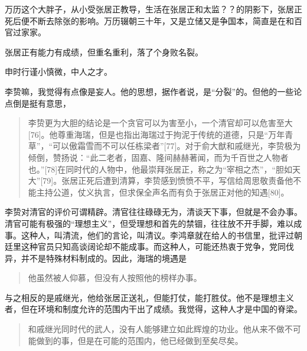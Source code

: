 万历这个大胖子，从小受张居正教导，生活在张居正和太监？？的阴影下，张居正死后便不断去除张的影响。万历辍朝三十年，又是立储又是争国本，简直是在和百官过家家。

张居正有能力有成绩，但重名重利，落了个身败名裂。

申时行谨小慎微，中人之才。

李贽嘛，我觉得有点像是妄人。他的思想，据作者说，是“分裂”的。但他的一些论点倒是挺有意思，
\begin{quotation}
李贽更为大胆的结论是一个贪官可以为害至小，一个清官却可以危害至大[76]。他尊重海瑞，但是也指出海瑞过于拘泥于传统的道德，只是“万年青草”，“可以傲霜雪而不可以任栋梁者”[77]。对于俞大猷和戚继光，李贽极为倾倒，赞扬说：“此二老者，固嘉、隆间赫赫著闻，而为千百世之人物者也。”[78]在同时代的人物中，他最崇拜张居正，称之为“宰相之杰”，“胆如天大”[79]。张居正死后遭到清算，李贽感到愤愤不平，写信给周思敬责备他不能主持公道，仗义执言，但求保全声名而有负于张居正对他的知遇[80]。
\end{quotation}
李贽对清官的评价可谓精辟。清官往往碌碌无为，清谈天下事，但就是不会办事。清官可能有极强的“理想主义”，但受理想和首先的禁锢，往往放不开手脚，难以成事。这种人，叫清流，他们的言论，叫清议。李鸿章就在给人的书信里，批评过朝廷里这种官员只知高谈阔论却不能成事。而这种人，可能还热衷于党争，党同伐异，并不是特殊材料制成的。因此，海瑞的境遇是
\begin{quotation}
他虽然被人仰慕，但没有人按照他的榜样办事。
\end{quotation}
与之相反的是戚继光，他给张居正送礼，但能打仗，能打胜仗。他不是理想主义者，但在环境和制度允许的范围内干出了成绩。我觉得，这种人才是中国的脊梁。
\begin{quotation}
和戚继光同时代的武人，没有人能够建立如此辉煌的功业。他从来不做不可能做到的事，但是在可能的范围内，他已经做到至矣尽矣。
\end{quotation}